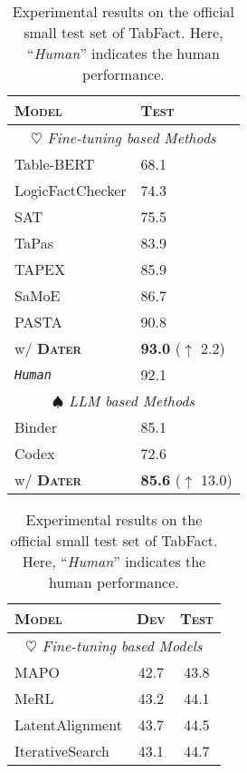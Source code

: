 \begin{table}
\centering
\begin{minipage}[t]{0.45\linewidth}
  \centering
  \begin{tabular}{ll}
    \toprule
    \textsc{\textbf{Model}} & \textsc{\textbf{Test}} \\
    \midrule
    \multicolumn{2}{c}{\textit{ $\heartsuit$ Fine-tuning based Methods}} \\
    Table-BERT & 68.1 \\
    LogicFactChecker & 74.3\\
    SAT     &   75.5 \\
    TaPas & 83.9\\
    TAPEX & 85.9 \\
    SaMoE & 86.7\\
    PASTA & 90.8 \\
    \rowcolor[RGB]{237,237,237} \quad w/ \textbf{\textsc{Dater}} & \textbf{93.0} ($\uparrow$ 2.2) \\
    \midrule
    \textit{\texttt{Human}}& {92.1}\\
    \midrule
    \multicolumn{2}{c}{\textit{ $\spadesuit$ LLM based Methods}} \\
    Binder & 85.1 \\
    Codex & 72.6 \\
    \rowcolor[RGB]{237,237,237} \quad w/ \textbf{\textsc{Dater}} & \textbf{85.6} ($\uparrow$ 13.0)  \\
    \bottomrule
  \end{tabular}
  \vspace{0.2cm}
  \caption{Experimental results on the official small test set of TabFact. Here, ``\textit{Human}'' indicates the human performance.}
  \label{tab:tabfact_small}
\end{minipage}
\hspace{0.3cm}
\begin{minipage}[t]{0.5\linewidth}
  \centering
  \begin{tabular}{lcc}
    \toprule
    \textsc{\textbf{Model}} & \textsc{\textbf{Dev}} & \textsc{\textbf{Test}} \\
    \midrule
    \multicolumn{3}{c}{\textit{$\heartsuit$ Fine-tuning based Models}} \\
    MAPO & 42.7 & 43.8 \\
    MeRL & 43.2 & 44.1 \\
    LatentAlignment & 43.7 & 44.5\\
    IterativeSearch & 43.1 & 44.7\\

\end{tabular}
\end{minipage}
\end{table}
